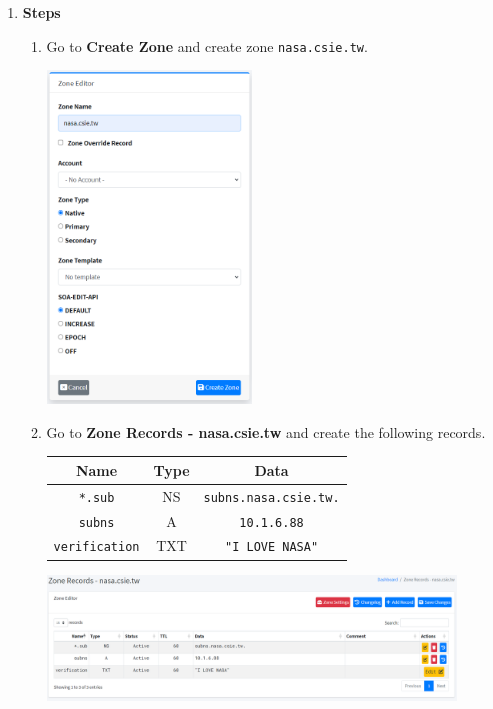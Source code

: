 \documentclass[12pt, a4paper]{article}
\begin{document}
\begin{enumerate}
    \pagebreak
    \item
    \textbf{Steps}
    \begin{enumerate}
      \item Go to \textbf{Create Zone} and create zone \verb|nasa.csie.tw|.

      \includegraphics[width=0.45\textwidth]{4-3_create_zone.png}

      \item Go to \textbf{Zone Records - nasa.csie.tw} and create the following records.

      \begin{tabular}{|c|c|c|}
        \hline
        \textbf{Name} & \textbf{Type} & \textbf{Data}\\\hline
        \verb|*.sub| & NS & \verb|subns.nasa.csie.tw.| \\
        \verb|subns| & A & \verb|10.1.6.88| \\
        \verb|verification| & TXT & \verb|"I LOVE NASA"| \\\hline
      \end{tabular}

      \includegraphics[width=0.9\textwidth]{4-3_zone_records.png}
    \end{enumerate}


\end{enumerate}
\end{document}
